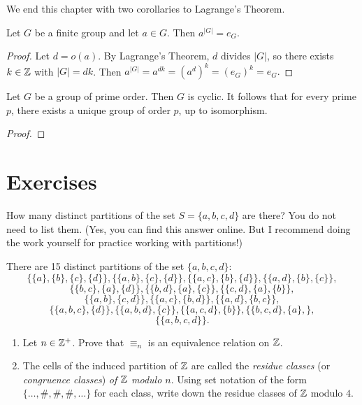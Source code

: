  We end this chapter with two corollaries to Lagrange's Theorem.

\begin{cor}\label{} Let $G$ be a finite group and let $a\in G$.  Then
$a^{|G|}=e_G$.
\end{cor}

\begin{proof} Let $d=o(a)$. By Lagrange's Theorem, $d$ divides $|G|$, so
there exists $k\in \mathbb{Z}$ with $|G|=dk$.  Then
$a^{|G|}=a^{dk}=(a^d)^k=(e_G)^k=e_G.$
\end{proof}

\begin{cor}\label{pcyc} Let $G$ be a group of prime order.  Then $G$ is
cyclic. It follows that for every prime $p$, there exists a unique
group of order $p$, up to isomorphism.
\end{cor}

\begin{proof}  \end{proof}

\pagebreak

\section{Exercises}
\begin{exercise}
How many distinct partitions of the set
    $S=\{a,b,c,d\}$ are there?  You do not need to list them.
    (Yes, you can find this answer online.  But I recommend
    doing the work yourself for practice working with
    partitions!)
\end{exercise}

\begin{solution}[print=false]
There are 15 distinct partitions of the set $\{a,b,c,d\}$:
    $$\{\{a\},\{b\},\{c\},\{d\}\}, \{\{a,b\},\{c\},\{d\}\},\{\{a,c\},\{b\},\{d\}\},\{\{a,d\},\{b\},\{c\}\},$$
    $$\{\{b,c\},\{a\},\{d\}\},\{\{b,d\},\{a\},\{c\}\},\{\{c,d\},\{a\},\{b\}\},$$
    $$\{\{a,b\},\{c,d\}\},
    \{\{a,c\},\{b,d\}\},\{\{a,d\},\{b,c\}\},$$
    $$\{\{a,b,c\},\{d\}\},\{\{a,b,d\},\{c\}\},\{\{a,c,d\},\{b\}\},\{\{b,c,d\},\{a\},\},$$
    $$\{\{a,b,c,d\}\}.$$

\end{solution}

\begin{exercise}
\begin{enumerate}
\item
Let  $n\in \mathbb{Z}^+$. Prove that  $\equiv_n$ is an equivalence relation on $\mathbb{Z}$.
\item The cells of the induced partition of $\mathbb{Z}$ are called
    the \textit{residue classes} (or \textit{congruence classes}) {\it of $\mathbb{Z}$ modulo $n$}.  Using
    set notation of the form $\{\ldots,\#, \#,\#,\ldots\}$
    for each class, write down the residue classes of $\mathbb{Z}$
    modulo $4$.
\end{enumerate}
\end{exercise}


